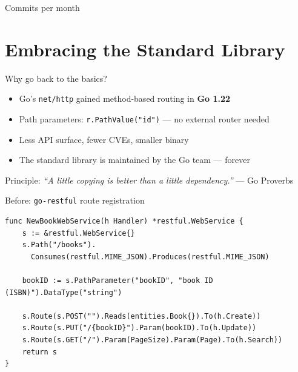 \documentclass[aspectratio=169,11pt]{beamer}
\begin{document}
\begin{frame}{Commits per month}
  \centering
\end{frame}

\section{Embracing the Standard Library}

\begin{frame}{Why go back to the basics?}
  \begin{itemize}
    \setlength\itemsep{6pt}
    \item Go's \texttt{net/http} gained method-based routing in \textbf{Go 1.22}
    \item Path parameters: \texttt{r.PathValue("id")} --- no external router needed
    \item Less API surface, fewer CVEs, smaller binary
    \item The standard library is maintained by the Go team --- forever
  \end{itemize}
  \vspace{8pt}
  \alert{Principle}: \emph{``A little copying is better than a little dependency.''}
  --- Go Proverbs
\end{frame}

\begin{frame}[fragile]{Before: \texttt{go-restful} route registration}
\begin{lstlisting}
func NewBookWebService(h Handler) *restful.WebService {
	s := &restful.WebService{}
	s.Path("/books").
	  Consumes(restful.MIME_JSON).Produces(restful.MIME_JSON)

	bookID := s.PathParameter("bookID", "book ID (ISBN)").DataType("string")

	s.Route(s.POST("").Reads(entities.Book{}).To(h.Create))
	s.Route(s.PUT("/{bookID}").Param(bookID).To(h.Update))
	s.Route(s.GET("/").Param(PageSize).Param(Page).To(h.Search))
	return s
}
\end{lstlisting}
\end{frame}
\end{document}
